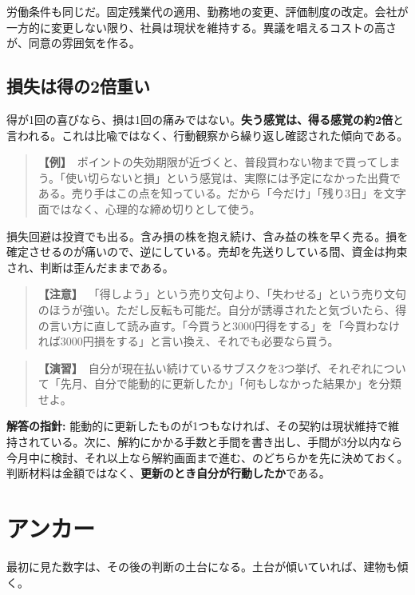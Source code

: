 \documentclass{article}
\begin{document}
労働条件も同じだ。固定残業代の適用、勤務地の変更、評価制度の改定。会社が一方的に変更しない限り、社員は現状を維持する。異議を唱えるコストの高さが、同意の雰囲気を作る。

\subsection{損失は得の2倍重い}

得が1回の喜びなら、損は1回の痛みではない。\textbf{失う感覚は、得る感覚の約2倍}と言われる。これは比喩ではなく、行動観察から繰り返し確認された傾向である。

\begin{quote}
\textbf{【例】}\ ポイントの失効期限が近づくと、普段買わない物まで買ってしまう。「使い切らないと損」という感覚は、実際には予定になかった出費である。売り手はこの点を知っている。だから「今だけ」「残り3日」を文字面ではなく、心理的な締め切りとして使う。
\end{quote}

損失回避は投資でも出る。含み損の株を抱え続け、含み益の株を早く売る。損を確定させるのが痛いので、逆にしている。売却を先送りしている間、資金は拘束され、判断は歪んだままである。

\begin{quote}
\textbf{【注意】}\ 「得しよう」という売り文句より、「失わせる」という売り文句のほうが強い。ただし反転も可能だ。自分が誘導されたと気づいたら、得の言い方に直して読み直す。「今買うと3000円得をする」を「今買わなければ3000円損をする」と言い換え、それでも必要なら買う。
\end{quote}

\begin{quote}
\textbf{【演習】}\ 自分が現在払い続けているサブスクを3つ挙げ、それぞれについて「先月、自分で能動的に更新したか」「何もしなかった結果か」を分類せよ。
\end{quote}

\textbf{解答の指針:} 能動的に更新したものが1つもなければ、その契約は現状維持で維持されている。次に、解約にかかる手数と手間を書き出し、手間が3分以内なら今月中に検討、それ以上なら解約画面まで進む、のどちらかを先に決めておく。判断材料は金額ではなく、\textbf{更新のとき自分が行動したか}である。

\section{アンカー}

最初に見た数字は、その後の判断の土台になる。土台が傾いていれば、建物も傾く。
\end{document}
